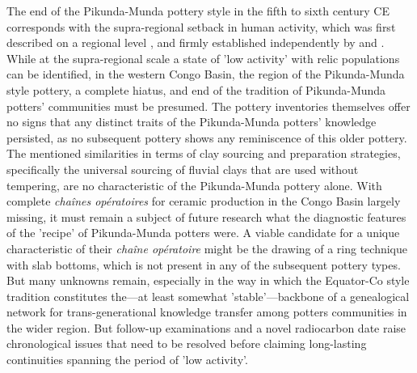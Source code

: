 \documentclass[smallextended,natbib]{svjour3}       %
\begin{document}
The end of the Pikunda-Munda pottery style in the fifth to sixth century CE corresponds with the supra-regional setback in human activity, which was first described on a regional level \citep{Oslisly.1998}, and firmly established independently by \citet{deSaulieu.2021a} and \citet{Seidensticker.2021}. While at the supra-regional scale a state of 'low activity' with relic populations \citep[cf.][Fig.~S4]{Seidensticker.2021} can be identified, in the western Congo Basin, the region of the Pikunda-Munda style pottery, a complete hiatus, and end of the tradition of Pikunda-Munda potters' communities must be presumed. The pottery inventories themselves offer no signs that any distinct traits of the Pikunda-Munda potters' knowledge persisted, as no subsequent pottery shows any reminiscence of this older pottery. The mentioned similarities in terms of clay sourcing and preparation strategies, specifically the universal sourcing of fluvial clays that are used without tempering, are no characteristic of the Pikunda-Munda pottery alone. With complete \textit{chaînes opératoires} for ceramic production in the Congo Basin largely missing, it must remain a subject of future research what the diagnostic features of the 'recipe' of Pikunda-Munda potters were. A viable candidate for a unique characteristic of their \textit{chaîne opératoire} might be the drawing of a ring technique with slab bottoms, which is not present in any of the subsequent pottery types. But many unknowns remain, especially in the way in which the Equator-Co style tradition \citep{Wotzka.1995} constitutes the---at least somewhat 'stable'---backbone of a genealogical network for trans-generational knowledge transfer among potters communities in the wider region. But follow-up examinations \citep[193--204]{Seidensticker.2021e} and a novel radiocarbon date \citep[Tab.~2: RICH-30867]{Seidensticker.2024} raise chronological issues that need to be resolved before claiming long-lasting continuities spanning the period of 'low activity'.
\end{document}
